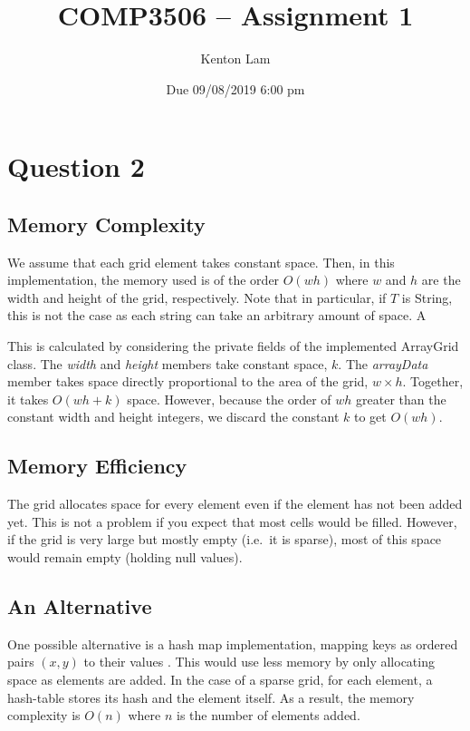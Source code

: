 \documentclass[11pt,a4paper]{article} %
\author{Kenton Lam}
\date{{Due 09/08/2019 6:00 pm}}
\title{COMP3506 -- Assignment 1}
\begin{document}
%

\setcounter{page}{1}
\maketitle
\section*{Question 2}
\subsection*{Memory Complexity}
We assume
that each grid element takes constant space. Then, 
in this implementation, the memory used is of the order 
$O(wh)$ where $w$ and 
$h$ are the width and height of the grid, respectively.
Note that 
in particular, if $T$ is String, this is not the case as each string 
can take an arbitrary amount of space. A

This is calculated by considering the private fields of the 
implemented ArrayGrid class. The \textit{width} and \textit{height}
members take constant space, $k$. The \textit{arrayData} member takes 
space directly proportional to the area of the grid, $w\times h$. 
Together, it takes $O(wh+k)$ space. However, because 
the order of $wh$ greater than the constant width and height integers, we 
discard the constant $k$ to get $O(wh)$.

\subsection*{Memory Efficiency}
The grid allocates space for every element even if the element has 
not been added yet. This is not a problem if you expect that most 
cells would be filled. However, if the grid is very large but 
mostly empty (i.e.\ it is sparse), most of this space would remain 
empty (holding null values).

\subsection*{An Alternative}
One possible alternative is a hash map implementation, mapping keys 
as ordered pairs $(x, y)$ to their values \cite{clrs}. This would use less memory 
by only allocating space as elements are added. In the case of 
a sparse grid, for each element, a hash-table stores its hash and the element 
itself. As a result, the memory complexity is $O(n)$ where $n$ is the 
number of elements added. 
\end{document}
